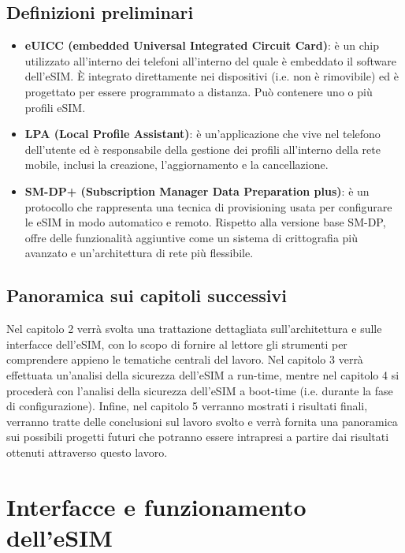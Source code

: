 \documentclass[10pt, twoside, openany]{book}
\begin{document}
\section{Definizioni preliminari}
\begin{itemize}
\item \textbf{eUICC (embedded Universal Integrated Circuit Card)}: è un chip utilizzato all'interno dei telefoni all'interno del quale è embeddato il software dell'eSIM. È integrato direttamente nei dispositivi (i.e. non è rimovibile) ed è progettato per essere programmato a distanza. Può contenere uno o più profili eSIM.
\item \textbf{LPA (Local Profile Assistant)}: è un'applicazione che vive nel telefono dell'utente ed è responsabile della gestione dei profili all'interno della rete mobile, inclusi la creazione, l'aggiornamento e la cancellazione.
\item \textbf{SM-DP+ (Subscription Manager Data Preparation plus)}: è un protocollo che rappresenta una tecnica di provisioning usata per configurare le eSIM in modo automatico e remoto. Rispetto alla versione base SM-DP, offre delle funzionalità aggiuntive come un sistema di crittografia più avanzato e un'architettura di rete più flessibile.
\end{itemize}

\section{Panoramica sui capitoli successivi}
Nel capitolo 2 verrà svolta una trattazione dettagliata sull'architettura e sulle interfacce dell'eSIM, con lo scopo di fornire al lettore gli strumenti per comprendere appieno le tematiche centrali del lavoro. Nel capitolo 3 verrà effettuata un'analisi della sicurezza dell'eSIM a run-time, mentre nel capitolo 4 si procederà con l'analisi della sicurezza dell'eSIM a boot-time (i.e. durante la fase di configurazione). Infine, nel capitolo 5 verranno mostrati i risultati finali, verranno tratte delle conclusioni sul lavoro svolto e verrà fornita una panoramica sui possibili progetti futuri che potranno essere intrapresi a partire dai risultati ottenuti attraverso questo lavoro.

\chapter{Interfacce e funzionamento dell'eSIM}
\end{document}
